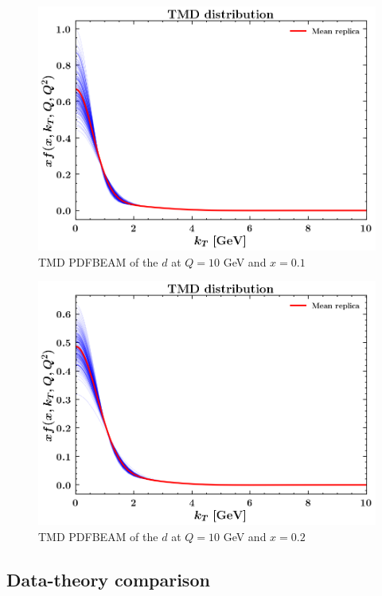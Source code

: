 \documentclass[]{article}
\begin{document}
\begin{figure}
\centering
\includegraphics{pngplots/tmd_1_10_0.1.png}
\caption{TMD PDFBEAM of the \(d\) at \(Q = 10\) GeV and \(x = 0.1\)}
\end{figure}

\begin{figure}
\centering
\includegraphics{pngplots/tmd_1_10_0.2.png}
\caption{TMD PDFBEAM of the \(d\) at \(Q = 10\) GeV and \(x = 0.2\)}
\end{figure}

\hypertarget{data-theory-comparison}{%
\subsection{Data-theory comparison}\label{data-theory-comparison}}
\end{document}
